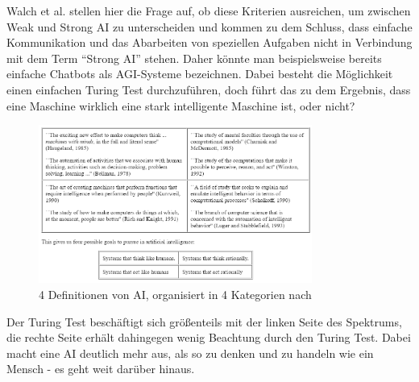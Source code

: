             Walch et al. stellen hier die Frage auf, ob diese Kriterien ausreichen, um zwischen Weak und Strong AI
            zu unterscheiden und kommen zu dem Schluss, dass einfache Kommunikation und das Abarbeiten von
            speziellen Aufgaben nicht in Verbindung mit dem Term ``Strong AI'' stehen. Daher könnte man beispielsweise
            bereits einfache Chatbots als AGI-Systeme bezeichnen. \cite{walch_world_2019} Dabei besteht die
            Möglichkeit einen einfachen Turing Test durchzuführen, doch führt das zu dem Ergebnis, dass eine
            Maschine wirklich eine stark intelligente Maschine ist, oder nicht?
            \begin{figure}[h]
                \begin{center}
                    \includegraphics[width=0.8\textwidth]{figures/ai-definitions.png}
                    \caption[4 Definitionen AI]{4 Definitionen von AI, organisiert in 4 Kategorien nach \cite{russell}}
                    \label{pic:ai-definitions}
                \end{center}
            \end{figure}
            Der Turing Test beschäftigt sich größenteils mit der linken Seite des Spektrums, die rechte Seite erhält
            dahingegen wenig Beachtung durch den Turing Test. Dabei macht eine AI deutlich mehr aus, als so zu denken
            und zu handeln wie ein Mensch - es geht weit darüber hinaus.


